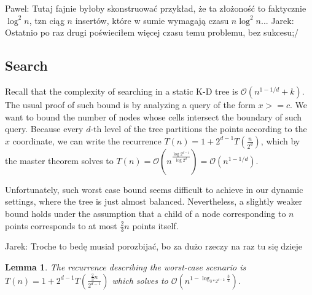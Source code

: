 \documentclass[10pt,a4paper]{article}
\newtheorem{lemma}{Lemma}
\newcommand{\pawel}[1]{\noindent\colorbox{myRed}{Pawel: #1}}
\newcommand{\jarek}[1]{\noindent\colorbox{myYellow}{Jarek: #1}}
\newcommand{\Oh}{\mathcal{O}}
\begin{document}
\pawel{Tutaj fajnie byłoby skonstruować przykład, że ta złożoność to faktycznie $\log^{2}n$, tzn ciąg $n$ insertów, które w sumie wymagają czasu $n\log^{2}n$...}
\jarek{Ostatnio po raz drugi poświeciłem więcej czasu temu problemu, bez sukcesu;/}

\subsection{Search}

Recall that the complexity of searching in a static K-D tree is $\Oh(n^{1-1/d} + k)$. The usual proof of such bound is by analyzing a query of the form $x>=c$. We want to bound the number of nodes whose cells intersect the boundary of such query. Because every $d$-th level of the tree partitions the points according to the $x$ coordinate, we can write the recurrence $T(n)=1+2^{d-1}T(\frac{n}{2^{d}})$, which by the master theorem solves to $T(n)=\Oh(n^{\frac{\log 2^{d-1}}{\log 2^{d}}})=\Oh(n^{1-1/d})$. 

Unfortunately, such worst case bound seems difficult to achieve in our dynamic settings, where the tree is just almost balanced. Nevertheless, a slightly weaker bound holds under the assumption that a child of a node corresponding to $n$ points corresponds to at most $\frac{2}{3}n$ points itself.

\jarek{Troche to bedę musiał porozbijać, bo za dużo rzeczy na raz tu się dzieje}
\begin{lemma}\label{lem:3}
The recurrence describing the worst-case scenario is $T(n)=1+2^{d-1}T(\frac{\frac{2}{3}n}{2^{d-1}})$ which solves to $\Oh(n^{1 - \log_{3*2^{d-2}}{\frac{3}{2}}})$.
\end{lemma}
\end{document}
